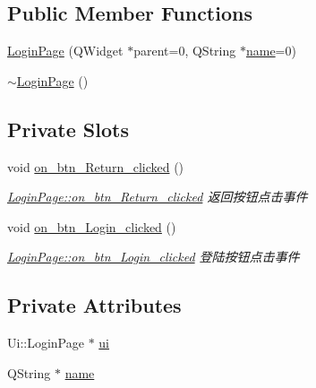 \subsection*{Public Member Functions}
\begin{DoxyCompactItemize}
\item 
\mbox{\hyperlink{class_login_page_ad4f5adfdd434bb9edfc44475deb1bafd}{Login\+Page}} (Q\+Widget $\ast$parent=0, Q\+String $\ast$\mbox{\hyperlink{class_login_page_ad452fd2d3b8b8268789b300e49b67a8f}{name}}=0)
\item 
\mbox{\hyperlink{class_login_page_ae3c843938f34258ac50eb89d30d31d8a}{$\sim$\+Login\+Page}} ()
\end{DoxyCompactItemize}
\subsection*{Private Slots}
\begin{DoxyCompactItemize}
\item 
void \mbox{\hyperlink{class_login_page_a084d6b451fc7302f0ef1e29ad34c2411}{on\+\_\+btn\+\_\+\+Return\+\_\+clicked}} ()
\begin{DoxyCompactList}\small\item\em \mbox{\hyperlink{class_login_page_a084d6b451fc7302f0ef1e29ad34c2411}{Login\+Page\+::on\+\_\+btn\+\_\+\+Return\+\_\+clicked}} 返回按钮点击事件 \end{DoxyCompactList}\item 
void \mbox{\hyperlink{class_login_page_a71d6fe164abd33be5b8cbf54baef3a1e}{on\+\_\+btn\+\_\+\+Login\+\_\+clicked}} ()
\begin{DoxyCompactList}\small\item\em \mbox{\hyperlink{class_login_page_a71d6fe164abd33be5b8cbf54baef3a1e}{Login\+Page\+::on\+\_\+btn\+\_\+\+Login\+\_\+clicked}} 登陆按钮点击事件 \end{DoxyCompactList}\end{DoxyCompactItemize}
\subsection*{Private Attributes}
\begin{DoxyCompactItemize}
\item 
Ui\+::\+Login\+Page $\ast$ \mbox{\hyperlink{class_login_page_a427700feff04d4252d0b9d406740bcc5}{ui}}
\item 
Q\+String $\ast$ \mbox{\hyperlink{class_login_page_ad452fd2d3b8b8268789b300e49b67a8f}{name}}
\end{DoxyCompactItemize}



